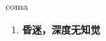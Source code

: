 
\begin{frame}
{\huge coma}
\begin{center}
\begin{enumerate}\Large
  \item \textbf{昏迷，深度无知觉}
\end{enumerate}
\end{center}
\end{frame}
